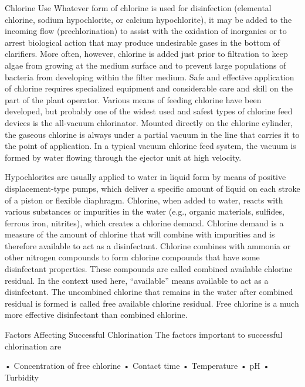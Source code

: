 \documentclass{article}
\begin{document}
Chlorine Use Whatever form of chlorine is used for disinfection
(elemental chlorine, sodium hypochlorite, or calcium hypochlorite), it
may be added to the incoming flow (prechlorination) to assist with the
oxidation of inorganics or to arrest biological action that may produce
undesirable gases in the bottom of clarifiers. More often, however,
chlorine is added just prior to filtration to keep algae from growing at
the medium surface and to prevent large populations of bacteria from
developing within the filter medium. Safe and effective application of
chlorine requires specialized equipment and considerable care and skill
on the part of the plant operator. Various means of feeding chlorine
have been developed, but probably one of the widest used and safest
types of chlorine feed devices is the all-vacuum chlorinator. Mounted
directly on the chlorine cylinder, the gaseous chlorine is always under
a partial vacuum in the line that carries it to the point of
application. In a typical vacuum chlorine feed system, the vacuum is
formed by water flowing through the ejector unit at high velocity.

Hypochlorites are usually applied to water in liquid form by means of
positive displacement-type pumps, which deliver a specific amount of
liquid on each stroke of a piston or flexible diaphragm. Chlorine, when
added to water, reacts with various substances or impurities in the
water (e.g., organic materials, sulfides, ferrous iron, nitrites), which
creates a chlorine demand. Chlorine demand is a measure of the amount of
chlorine that will combine with impurities and is therefore available to
act as a disinfectant. Chlorine combines with ammonia or other nitrogen
compounds to form chlorine compounds that have some disinfectant
properties. These compounds are called combined available chlorine
residual. In the context used here, ``available'' means available to act
as a disinfectant. The uncombined chlorine that remains in the water
after combined residual is formed is called free available chlorine
residual. Free chlorine is a much more effective disinfectant than
combined chlorine.

Factors Affecting Successful Chlorination The factors important to
successful chlorination are

• Concentration of free chlorine • Contact time • Temperature • pH •
Turbidity
\end{document}
